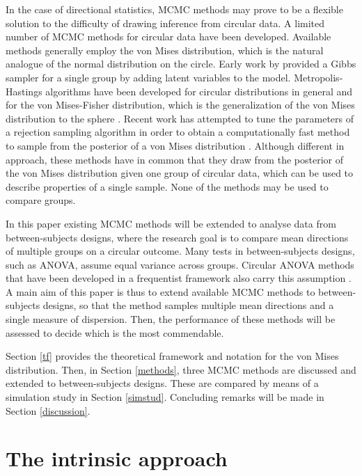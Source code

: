 \documentclass[bib]{ba/ba}
\begin{document}
In the case of directional statistics, MCMC methods may prove to be a flexible solution to the difficulty of drawing inference from circular data. A limited number of MCMC methods for circular data have been developed. Available methods generally employ the von Mises distribution, which is the natural analogue of the normal distribution on the circle. Early work by \citet{damien1999fullbayes} provided a Gibbs sampler for a single group by adding latent variables to the model. Metropolis-Hastings algorithms have been developed for circular distributions in general \citep{Bhattacharya2009} and for the von Mises-Fisher distribution, which is the generalization of the von Mises distribution to the sphere \citep{nunez2005bayesian}. Recent work has attempted to tune the parameters of a rejection sampling algorithm in order to obtain a computationally fast method to sample from the posterior of a von Mises distribution \citep{forbes2014fast}. Although different in approach, these methods have in common that they draw from the posterior of the von Mises distribution given one group of circular data, which can be used to describe properties of a single sample. None of the methods may be used to compare groups. 

In this paper existing MCMC methods will be extended to analyse data from between-subjects designs, where the research goal is to compare mean directions of multiple groups on a circular outcome. Many tests in between-subjects designs, such as ANOVA, assume equal variance across groups. Circular ANOVA methods that have been developed in a frequentist framework also carry this assumption \citep{harrison1988development, harrison1986analysis}. A main aim of this paper is thus to extend available MCMC methods to between-subjects designs, so that the method samples multiple mean directions and a single measure of dispersion. Then, the performance of these methods will be assessed to decide which is the most commendable. 

Section \ref{tf} provides the theoretical framework and notation for the von Mises distribution. Then, in Section \ref{methods}, three MCMC methods are discussed and extended to between-subjects designs. These are compared by means of a simulation study in Section \ref{simstud}. Concluding remarks will be made in Section \ref{discussion}.

\section{The intrinsic approach \label{tf}}
\end{document}
